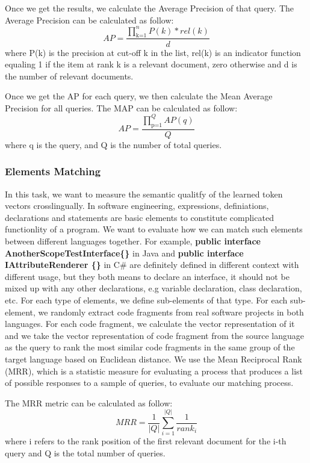 Once we get the results, we calculate the Average Precision of that query. 
The Average Precision can be calculated as follow:
\begin{displaymath}
AP = \frac{\prod_\text{k=1}^n P(k)*rel(k)}{d}
\end{displaymath}
where P(k) is the precision at cut-off k in the list, rel(k) is an indicator function equaling 1 if the item at rank k is a relevant document, zero otherwise and d is the number of relevant documents.

Once we get the AP for each query, we then calculate the Mean Average Precision for all queries. The MAP can be calculated as follow:
\begin{displaymath}
AP = \frac{\prod_\text{p=1}^Q AP(q)}{Q}
\end{displaymath}
where q is the query, and Q is the number of total queries.

\subsubsection{Elements Matching}
In this task, we want to measure the semantic qualitfy of the learned token vectors crosslingually. In software engineering, expressions, definiations, declarations and statements are basic elements to constitute complicated functionlity of a program. We want to evaluate how we can match such elements between different languages together. For example, \textbf{public interface AnotherScopeTestInterface\{\}} in Java and \textbf{public interface IAttributeRenderer \{\}} in C\# are definitely defined in different context with different usage, but they both means to declare an interface, it should not be mixed up with any other declarations, e.g variable declaration, class declaration, etc. For each type of elements, we define sub-elements of that type. For each sub-element, we randomly extract code fragments from real software projects in both languages. For each code fragment, we calculate the vector representation of it and we take the vector representation of code fragment from the source language as the query to rank the most similar code fragments in the same group of the target language based on Euclidean distance. We use the Mean Reciprocal Rank (MRR), which is a statistic measure for evaluating a process that produces a list of possible responses to a sample of queries, to evaluate our matching process.

The MRR metric can be calculated as follow:
\begin{displaymath}
MRR = \frac{1}{|Q|}\sum_{i=1}^{|Q|}\frac{1}{rank_{i}}
\end{displaymath}
where i refers to the rank position of the first relevant document for the i-th query and Q is the total number of queries.

